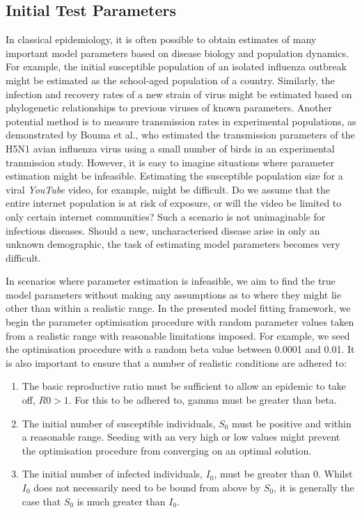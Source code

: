\subsection{Initial Test Parameters}
In classical epidemiology, it is often possible to obtain estimates of
many important model parameters based on disease biology and
population dynamics. For example, the initial susceptible population
of an isolated influenza outbreak might be estimated as the school-aged
population of a country. Similarly, the infection and recovery rates of a
new strain of virus might be estimated based on phylogenetic relationships
to previous viruses of known parameters.\cite{volz} Another potential method is to measure
transmission rates in experimental populations, as demonstrated by
Bouma et al., who estimated the transmission parameters of the H5N1
avian influenza virus using a small number of birds in an experimental
tranmission study.\cite{bouma} However, it is easy to imagine
situations where parameter estimation might be infeasible. Estimating
the susceptible population size for a viral \emph{YouTube} video, for
example, might be difficult. Do we assume that the entire internet
population is at risk of exposure, or will the video be limited to only
certain internet communities? Such a scenario is not unimaginable for
infectious diseases. Should a new, uncharacterised disease arise in
only an unknown demographic, the task of estimating model parameters
becomes very difficult.

In scenarios where parameter estimation is infeasible, we aim to find
the true model parameters without making any assumptions as to where
they might lie other than within a realistic range. In the presented
model fitting framework, we begin the parameter optimisation procedure
with random parameter values taken from a realistic range with
reasonable limitations imposed. For example, we seed the optimisation
procedure with a random beta value between 0.0001 and 0.01. It is also
important to ensure that a number of realistic conditions are adhered
to:

\begin{enumerate}
  \item The basic reproductive ratio must be sufficient to allow an
    epidemic to take off, $R0 > 1$. For this to be adhered to, gamma
    must be greater than beta.
  \item The initial number of susceptible individuals, $S_0$ must be
    positive and within a reasonable range. Seeding with an
    very high or low values might prevent the optimisation
    procedure from converging on an optimal solution.
  \item The initial number of infected individuals, $I_0$, must be
    greater than 0. Whilst $I_0$ does not necessarily need to be bound
   from above by $S_0$, it is generally the case that $S_0$ is
   much greater than $I_0$. 
\end{enumerate}

